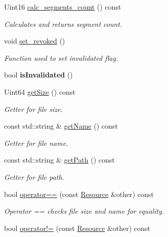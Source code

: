 \begin{DoxyCompactItemize}
Uint16 \hyperlink{classsimpleP2P_1_1Resource_a4bbfde4d1e25c62ae4da0e6dfd64900b}{calc\+\_\+segments\+\_\+count} () const
\begin{DoxyCompactList}\small\item\em Calculates and returns segment count. \end{DoxyCompactList}\item 
void \hyperlink{classsimpleP2P_1_1Resource_a49e46561e4088f78bb96c07c12d4738c}{set\+\_\+revoked} ()
\begin{DoxyCompactList}\small\item\em Function used to set invalidated flag. \end{DoxyCompactList}\item 
\mbox{\label{classsimpleP2P_1_1Resource_a3b271172c4b67a378c264babbc1d72a1}} 
bool {\bfseries is\+Invalidated} ()
\item 
Uint64 \hyperlink{classsimpleP2P_1_1Resource_adadeb491cccabbce2e1d883f9e8519f7}{get\+Size} () const
\begin{DoxyCompactList}\small\item\em Getter for file size. \end{DoxyCompactList}\item 
const std\+::string \& \hyperlink{classsimpleP2P_1_1Resource_adc12496aedf1729852d2c98bf94428aa}{get\+Name} () const
\begin{DoxyCompactList}\small\item\em Getter for file name. \end{DoxyCompactList}\item 
const std\+::string \& \hyperlink{classsimpleP2P_1_1Resource_a866cdd2e717abf3515629ca73b2f80b8}{get\+Path} () const
\begin{DoxyCompactList}\small\item\em Getter for file path. \end{DoxyCompactList}\item 
bool \hyperlink{classsimpleP2P_1_1Resource_a0b42735bed5ab425b9e26b660ededecf}{operator==} (const \hyperlink{classsimpleP2P_1_1Resource}{Resource} \&other) const
\begin{DoxyCompactList}\small\item\em Operator == checks file size and name for equality. \end{DoxyCompactList}\item 
bool \hyperlink{classsimpleP2P_1_1Resource_a5694c4c5a3d5b303a1fa0dcb3fb478b1}{operator!=} (const \hyperlink{classsimpleP2P_1_1Resource}{Resource} \&other) const

\end{DoxyCompactItemize}
